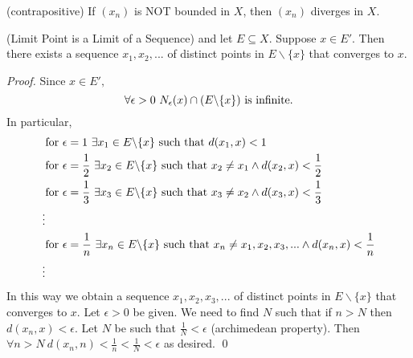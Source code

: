      \begin{corollary} (contrapositive)
        If $(x_n)$ is NOT bounded in $X$, then $(x_n)$ diverges in $X$.
     \end{corollary}

     \begin{theorem}(Limit Point is a Limit of a Sequence)
        \routineMS and let $E\subseteq X$. Suppose $x \in E'$. Then there exists a sequence $x_1, x_2, ...$ of distinct points in $E \backslash \{x\}$ that converges to $x$.
     \end{theorem}
     \begin{proof}
        Since $x\in E',$
        $$\forall \epsilon > 0 ~N_{\epsilon}(x) \cap (E \backslash \{x\}) \text{ is infinite.}$$
        In particular,
        \begin{align*}
            &\text{for } \epsilon = 1 ~\exists x_1 \in E \backslash \{x\} \text{ such that } d(x_1, x) < 1 \\
            &\text{for } \epsilon = \frac{1}{2} ~\exists x_2 \in E \backslash \{x\} \text{ such that } x_2 \not = x_1 \wedge d(x_2, x) < \frac{1}{2} \\
            &\text{for } \epsilon = \frac{1}{3} ~\exists x_3 \in E \backslash \{x\} \text{ such that } x_3 \not = x_2 \wedge d(x_3, x) < \frac{1}{3} \\
            \vdots \\
            &\text{for } \epsilon = \frac{1}{n} ~\exists x_n \in E \backslash \{x\} \text{ such that } x_n \not = x_1, x_2, x_3,... \wedge d(x_n, x) < \frac{1}{n} \\
            \vdots
        \end{align*}
        In this way we obtain a sequence $x_1, x_2, x_3,...$ of distinct points in $E \backslash \{x\}$ that converges to $x$.
        Let $\epsilon > 0$ be given. We need to find $N$ such that if $n > N$ then $d(x_n, x) < \epsilon$. Let $N$ be such that $\frac{1}{N} < \epsilon$ (archimedean property). Then $\forall n > N ~d(x_n, n) < \frac{1}{n} < \frac{1}{N} < \epsilon$ as desired. \qed
     \end{proof}
%